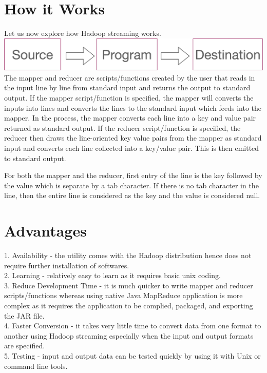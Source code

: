 \documentclass[11pt]{book}
\begin{document}
\section{How it Works}

Let us now explore how Hadoop streaming works.\\

\includegraphics[width=14cm]{streaming}\\

The mapper and reducer are scripts/functions created by the user that reads in the input line by line from standard input and returns the output to standard output. If the mapper script/function is specified, the mapper will converts the inputs into lines and converts the lines to the standard input which feeds into the mapper. In the process, the mapper converts each line into a key and value pair returned as standard output. If the reducer script/function is specified, the reducer then draws the line-oriented key value pairs from the mapper as standard input and converts each line collected into a key/value pair. This is then emitted to standard output. 

For both the mapper and the reducer, first entry of the line is the key followed by the value which is separate by a tab character. If there is no tab character in the line, then the entire line is considered as the key and the value is considered null. 

\section{Advantages}

1. Availability - the utility comes with the Hadoop distribution hence does not require further installation of softwares.\\
2. Learning - relatively easy to learn as it requires basic unix coding.\\
3. Reduce Development Time - it is much quicker to write mapper and reducer scripts/functions whereas using native Java MapReduce application is more complex as it requires the application to be complied, packaged, and exporting the JAR file.\\
4. Faster Conversion - it takes very little time to convert data from one format to another using Hadoop streaming especially when the input and output formats are specified.\\
5. Testing - input and output data can be tested quickly by using it with Unix or command line tools.
\end{document}
